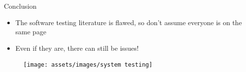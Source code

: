 \begin{frame}{Conclusion}
    \begin{itemize}
        \item The software testing literature is flawed, so
              don't assume everyone is on the same page

               \pause
        \item Even if they are, there can still be issues!
    \end{itemize}
    \begin{figure}
        \texttt{[image: assets/images/system testing]}
        \caption{\tiny \citep[p.~23]{Firesmith2015}}
    \end{figure}
\end{frame}
